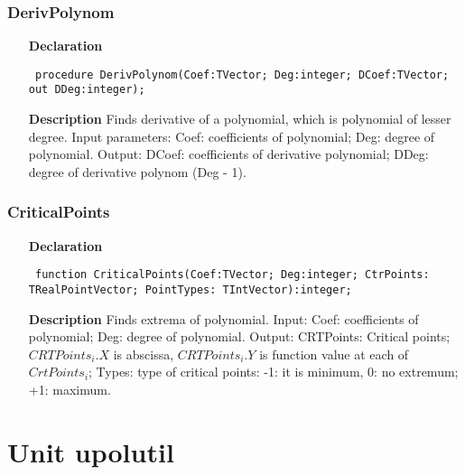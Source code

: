 \documentclass[12pt,a4paper,oneside]{report}
\newcommand{\declarationitem}[1]{\textbf{#1}}
\newcommand{\descriptiontitle}[1]{\textbf{#1}}
\newcommand{\code}[1]{\texttt{#1}}
\begin{document}
\subsubsection{DerivPolynom}
\label{ucrtptpol-DerivPolynom}
\begin{itemize}\item[\declarationitem{Declaration}\hfill]
	\begin{flushleft}
		\code{
			procedure DerivPolynom(Coef:TVector; Deg:integer; DCoef:TVector; out DDeg:integer);}
		
	\end{flushleft}
	
	\par
	\item[\descriptiontitle{Description}]
	Finds derivative of a polynomial, which is polynomial of lesser degree. Input parameters: Coef: coefficients of polynomial; Deg: degree of polynomial. Output: DCoef: coefficients of derivative polynomial; DDeg: degree of derivative polynom (Deg - 1).
	
\end{itemize}
\subsubsection{CriticalPoints}
\label{ucrtptpol-CriticalPoints}
\begin{itemize}\item[\declarationitem{Declaration}\hfill]
	\begin{flushleft}
		\code{
			function CriticalPoints(Coef:TVector; Deg:integer; CtrPoints: TRealPointVector; PointTypes: TIntVector):integer;}
		
	\end{flushleft}
	
	\par
	\item[\descriptiontitle{Description}]
	Finds extrema of polynomial.  Input: Coef: coefficients of polynomial; Deg: degree of polynomial. Output: CRTPoints: Critical points; $CRTPoints_i.X$ is abscissa, $CRTPoints_i.Y$ is function value at each of $CrtPoints_i$; Types: type of critical points: -1: it is minimum, 0: no extremum; +1: maximum.
	
\end{itemize}
\section{Unit upolutil}
\label{upolutil}
\end{document}
